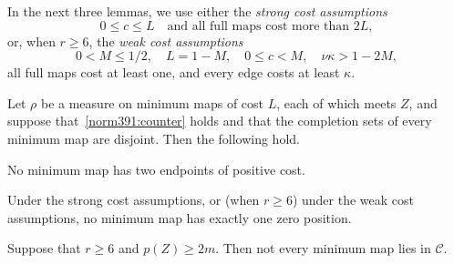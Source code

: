 In the next three lemmas, we use either the \emph{strong cost assumptions}
\[
 0\le c\le L\quad\text{and all full maps cost more than }2L,
\]
or, when $r\ge6$, the \emph{weak cost assumptions}
\[
0<M\le1/2,\quad L=1-M,\quad 0\le c<M,\quad \nu\kappa>1-2M,
\]
all full maps cost at least one, and every edge costs at least $\kappa$.

\begin{lemma}
\label{norm391:boundary}\label{norm391:boundary:rest}
Let $\rho$ be a measure on minimum maps of cost $L$, each of which meets $Z$, and suppose that~\eqref{norm391:counter} holds and that the completion sets of every minimum map are disjoint. Then the following hold.
\begin{props}
\item\label{boundary:two} No minimum map has two endpoints of positive cost.
\item\label{boundary:one} Under the strong cost assumptions, or (when $r\ge6$) under the weak cost assumptions, no minimum map has exactly one zero position.
\item\label{boundary:C} Suppose that $r\ge6$ and $p(Z)\ge2m$. Then not every minimum map lies in $\mathcal C$.
\end{props}
\end{lemma}

